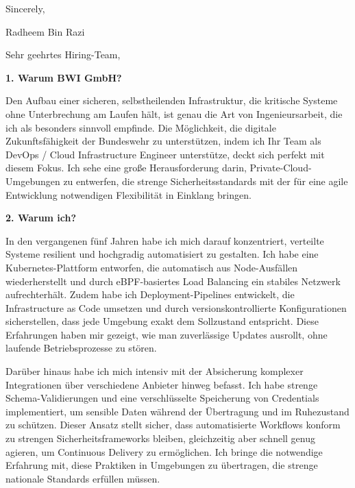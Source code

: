 \documentclass[11pt,a4paper]{coverletter}
\begin{document}
\closing{Sincerely,}{Radheem Bin Razi}

\clearpage
{}


\opening{Sehr geehrtes Hiring-Team,}

\vspace{8pt}\noindent\textbf{1. Warum BWI GmbH?}\par\vspace{3pt}

Den Aufbau einer sicheren, selbstheilenden Infrastruktur, die kritische Systeme ohne Unterbrechung am Laufen hält, ist genau die Art von Ingenieursarbeit, die ich als besonders sinnvoll empfinde. Die Möglichkeit, die digitale Zukunftsfähigkeit der Bundeswehr zu unterstützen, indem ich Ihr Team als DevOps / Cloud Infrastructure Engineer unterstütze, deckt sich perfekt mit diesem Fokus. Ich sehe eine große Herausforderung darin, Private-Cloud-Umgebungen zu entwerfen, die strenge Sicherheitsstandards mit der für eine agile Entwicklung notwendigen Flexibilität in Einklang bringen.

\vspace{8pt}\noindent\textbf{2. Warum ich?}\par\vspace{3pt}

In den vergangenen fünf Jahren habe ich mich darauf konzentriert, verteilte Systeme resilient und hochgradig automatisiert zu gestalten. Ich habe eine Kubernetes-Plattform entworfen, die automatisch aus Node-Ausfällen wiederherstellt und durch eBPF-basiertes Load Balancing ein stabiles Netzwerk aufrechterhält. Zudem habe ich Deployment-Pipelines entwickelt, die Infrastructure as Code umsetzen und durch versionskontrollierte Konfigurationen sicherstellen, dass jede Umgebung exakt dem Sollzustand entspricht. Diese Erfahrungen haben mir gezeigt, wie man zuverlässige Updates ausrollt, ohne laufende Betriebsprozesse zu stören.

Darüber hinaus habe ich mich intensiv mit der Absicherung komplexer Integrationen über verschiedene Anbieter hinweg befasst. Ich habe strenge Schema-Validierungen und eine verschlüsselte Speicherung von Credentials implementiert, um sensible Daten während der Übertragung und im Ruhezustand zu schützen. Dieser Ansatz stellt sicher, dass automatisierte Workflows konform zu strengen Sicherheitsframeworks bleiben, gleichzeitig aber schnell genug agieren, um Continuous Delivery zu ermöglichen. Ich bringe die notwendige Erfahrung mit, diese Praktiken in Umgebungen zu übertragen, die strenge nationale Standards erfüllen müssen.
\end{document}
